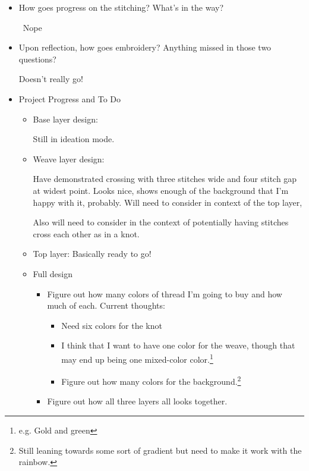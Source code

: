 \documentclass[12pt]{article}
\renewcommand{\,}{\textsuperscript{,}}
\begin{document}
\begin{itemize}
\begin{itemize}
\begin{itemize}
 \item How goes progress on the stitching? What's in the way?

 Nope  
   
 \item Upon reflection, how goes embroidery? Anything missed in those two questions?

Doesn't really go!  
   
 \item Project Progress and To Do %
 \begin{itemize}  
 \item Base layer design:  
   
 Still in ideation mode.  
 \item Weave layer design:  
   
Have demonstrated crossing with three stitches wide and four stitch gap at widest point. Looks nice, shows enough of the background that I'm happy with it, probably.  
Will need to consider in context of the top layer,  
   
Also will need to consider in the context of potentially having stitches cross each other as in a knot. %

 \item Top layer: Basically ready to go!  

 \item Full design  
 \begin{itemize}  
 \item Figure out how many colors of thread I'm going to buy and how much of each. Current thoughts:  
 \begin{itemize}   
 \item Need six colors for the knot   
 \item I think that I want to have one color for the weave, though that may end up being one mixed-color color.\footnote{e.g. Gold and green}   
 \item Figure out how many colors for the background.\footnote{Still leaning towards some sort of gradient but need to make it work with the rainbow.}   
 \end{itemize}  
 \item Figure out how all three layers all looks together.


\end{itemize}
\end{itemize}
\end{itemize}
\end{itemize}
\end{itemize}
\end{document}
